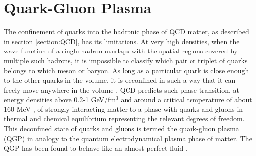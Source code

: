 \section{Quark-Gluon Plasma}
The confinement of quarks into the hadronic phase of QCD matter, as described in section \ref{section:QCD}, has its limitations. At very high densities, when the wave function of a single hadron overlaps with the spatial regions covered by multiple such hadrons, it is impossible to classify which pair or triplet of quarks belongs to which meson or baryon. As long as a particular quark is close enough to the other quarks in the volume, it is deconfined in such a way that it can freely move anywhere in the volume \cite{0954-3899-32-3-R01}. QCD predicts such phase transition, at energy densities above 0.2-1 GeV/fm$^{3}$ \cite{Adam:2139456} and around a critical temperature of about 160 MeV \cite{FLORIS2014103}, of strongly interacting matter to a phase with quarks and gluons in thermal and chemical equilibrium representing the relevant degrees of freedom. This deconfined state of quarks and gluons is termed the quark-gluon plasma (QGP) in analogy to the quantum electrodynamical plasma phase of matter. The QGP has been found to behave like an almost perfect fluid \cite{PhysRevLett.109.152303}.
